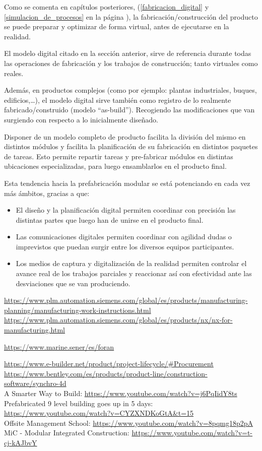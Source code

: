 \documentclass[spanish,12pt,a4paper,final,oneside]{book}
\begin{document}
Como se comenta en capítulos posteriores, (\ref{fabricacion_digital} y \ref{simulacion_de_procesos} en la página \pageref{fabricacion_digital}), la fabricación/construcción del producto se puede preparar y optimizar de forma virtual, antes de ejecutarse en la realidad.

El modelo digital citado en la sección anterior, sirve de referencia durante todas las operaciones de fabricación y los trabajos de construcción; tanto virtuales como reales.

Además, en productos complejos (como por ejemplo: plantas industriales, buques, edificios,\ldots), el modelo digital sirve también como registro de lo realmente fabricado/construido (modelo ``as-build''). Recogiendo las modificaciones que van surgiendo con respecto a lo inicialmente diseñado.

Disponer de un modelo completo de producto facilita la división del mismo en distintos módulos y facilita la planificación de su fabricación en distintos paquetes de tareas. Esto permite repartir tareas y pre-fabricar módulos en distintas ubicaciones especializadas, para luego ensamblarlos en el producto final.

Esta tendencia hacia la prefabricación modular se está potenciando en cada vez más ámbitos, gracias a que:
\begin{itemize}
\item El diseño y la planificación digital permiten coordinar con precisión las distintas partes que luego han de unirse en el producto final.
\item Las comunicaciones digitales permiten coordinar con agilidad dudas o imprevistos que puedan surgir entre los diversos equipos participantes. 
\item Los medios de captura y digitalización de la realidad permiten controlar el avance real de los trabajos parciales y reaccionar así con efectividad ante las desviaciones que se van produciendo.
\end{itemize}

{\footnotesize \url{https://www.plm.automation.siemens.com/global/es/products/manufacturing-planning/manufacturing-work-instructions.html}}
\\{\small \url{https://www.plm.automation.siemens.com/global/es/products/nx/nx-for-manufacturing.html}}

\url{https://www.marine.sener/es/foran}

\url{https://www.e-builder.net/product/project-lifecycle/#Procurement}
\\ \url{https://www.bentley.com/es/products/product-line/construction-software/synchro-4d}
\\A Smarter Way to Build: \url{https://www.youtube.com/watch?v=j6PqIidY8ts}
\\ Prefabricated 9 level building goes up in 5 days:
\\ \url{https://www.youtube.com/watch?v=CYZXNDKoGtA&t=15}
\\Offsite Management School: \url{https://www.youtube.com/watch?v=8pqmg18p2pA}
\\MiC - Modular Integrated Construction: \url{https://www.youtube.com/watch?v=t-cj-kAJbvY}
\end{document}
